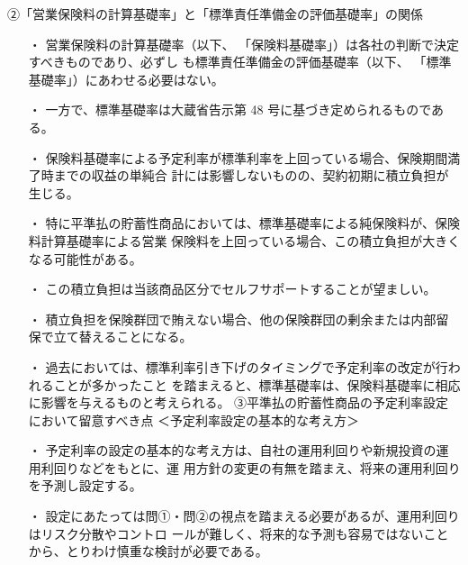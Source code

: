 \documentclass[report,gutter=10mm,fore-edge=10mm,uplatex,dvipdfmx]{jlreq}
\begin{document}
②「営業保険料の計算基礎率」と「標準責任準備金の評価基礎率」の関係

\begin{itemize}
\item[・] 営業保険料の計算基礎率（以下、
 「保険料基礎率」）は各社の判断で決定すべきものであり、必ずし
 も標準責任準備金の評価基礎率（以下、
 「標準基礎率」）にあわせる必要はない。
\item[・] 一方で、標準基礎率は大蔵省告示第 48 号に基づき定められるものである。
\item[・] 保険料基礎率による予定利率が標準利率を上回っている場合、保険期間満了時までの収益の単純合
 計には影響しないものの、契約初期に積立負担が生じる。
\item[・] 特に平準払の貯蓄性商品においては、標準基礎率による純保険料が、保険料計算基礎率による営業
 保険料を上回っている場合、この積立負担が大きくなる可能性がある。
\item[・] この積立負担は当該商品区分でセルフサポートすることが望ましい。
\item[・] 積立負担を保険群団で賄えない場合、他の保険群団の剰余または内部留保で立て替えることになる。
\item[・] 過去においては、標準利率引き下げのタイミングで予定利率の改定が行われることが多かったこと
 を踏まえると、標準基礎率は、保険料基礎率に相応に影響を与えるものと考えられる。
 ③平準払の貯蓄性商品の予定利率設定において留意すべき点
 ＜予定利率設定の基本的な考え方＞
\item[・] 予定利率の設定の基本的な考え方は、自社の運用利回りや新規投資の運用利回りなどをもとに、運
 用方針の変更の有無を踏まえ、将来の運用利回りを予測し設定する。
\item[・] 設定にあたっては問①・問②の視点を踏まえる必要があるが、運用利回りはリスク分散やコントロ
 ールが難しく、将来的な予測も容易ではないことから、とりわけ慎重な検討が必要である。
\end{itemize}


\end{document}
